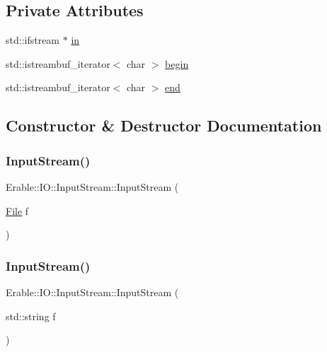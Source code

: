 \subsection*{Private Attributes}
\begin{DoxyCompactItemize}
\item 
std\+::ifstream $\ast$ \mbox{\hyperlink{class_erable_1_1_i_o_1_1_input_stream_a6971259f7e4a52a38e6f999419c95588}{in}}
\item 
std\+::istreambuf\+\_\+iterator$<$ char $>$ \mbox{\hyperlink{class_erable_1_1_i_o_1_1_input_stream_ae5ef880f2573b7d486c72007c85bb759}{begin}}
\item 
std\+::istreambuf\+\_\+iterator$<$ char $>$ \mbox{\hyperlink{class_erable_1_1_i_o_1_1_input_stream_aa65bd60380fa5a413f8a7689ee86f2f9}{end}}
\end{DoxyCompactItemize}


\subsection{Constructor \& Destructor Documentation}
\mbox{\label{class_erable_1_1_i_o_1_1_input_stream_ad71880c93829a386f863013a97fad3e5}} 
\subsubsection{\texorpdfstring{InputStream()}{InputStream()}\hspace{0.1cm}{\footnotesize\ttfamily [1/2]}}
{\footnotesize\ttfamily Erable\+::\+I\+O\+::\+Input\+Stream\+::\+Input\+Stream (\begin{DoxyParamCaption}\item[{\mbox{\hyperlink{class_erable_1_1_i_o_1_1_file}{File}}}]{f }\end{DoxyParamCaption})\hspace{0.3cm}{\ttfamily [inline]}}

\mbox{\label{class_erable_1_1_i_o_1_1_input_stream_a9f63847d7c6e31e4e0385c26ae613b0b}} 
\subsubsection{\texorpdfstring{InputStream()}{InputStream()}\hspace{0.1cm}{\footnotesize\ttfamily [2/2]}}
{\footnotesize\ttfamily Erable\+::\+I\+O\+::\+Input\+Stream\+::\+Input\+Stream (\begin{DoxyParamCaption}\item[{std\+::string}]{f }\end{DoxyParamCaption})\hspace{0.3cm}{\ttfamily [inline]}}



